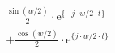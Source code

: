 \begin{align*}
  \frac{\sin(w/2)}{2} \cdot \textrm{e}^{\{-j \cdot w/2 \cdot t \}}\\
+ \frac{\cos(w/2)}{2} \cdot \textrm{e}^{\{ j \cdot w/2 \cdot t \}}
\end{align*}
